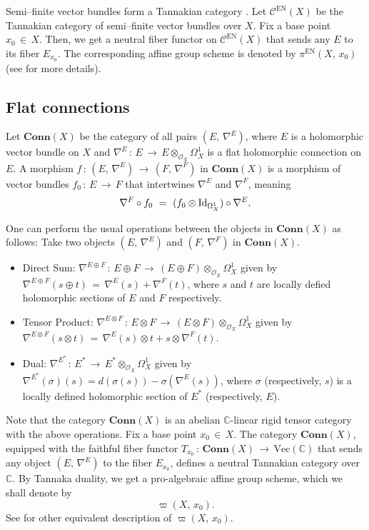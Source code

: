 \documentclass[12pt]{amsart}
\theoremstyle{definition}
\numberwithin{equation}{section}
\newcommand{\C}{\mathbb{C}}
\begin{document}
Semi--finite vector bundles form a Tannakian category \cite[Proposition 2.14]{Ot}.
Let $\mathcal{C}^{\mathrm{EN}}(X)$ be the Tannakian category of semi--finite vector
bundles over $X$. Fix a base point $x_0 \,\in \,X$. Then, we get a neutral fiber functor on
$\mathcal{C}^{\mathrm{EN}}(X)$ that sends any $E$ to its
fiber $E_{x_0}$. The corresponding affine group scheme is denoted by $\pi^{\mathrm{EN}}(X,\,x_0)$ 
(see \cite{Ot} for more details).

\subsection{Flat connections}

Let $\mathbf{Conn}(X)$ be the category of all pairs $(E,\,\nabla^E)$, where $E$ is a 
holomorphic vector bundle on $X$ and $\nabla^E\,:\, E \,\longrightarrow
\, E \otimes_{\mathcal{O}_X} \Omega_X^1$ is a flat holomorphic connection on $E$.
A morphism $f\,:\, (E,\, \nabla^E) \,\longrightarrow\, (F,\, \nabla^F)$ in $\mathbf{Conn}(X)$
is a morphism of vector bundles $f_0\, :\, E\, \longrightarrow\, F$ that intertwines $\nabla^E$ 
and $\nabla^F$, meaning
$$
\nabla^F\circ f_0 \ =\ (f_0\otimes {\rm Id}_{\Omega_X^1})\circ\nabla^E.
$$

One can perform the usual operations between the objects in $\mathbf{Conn}(X)$ as follows:
Take two objects $(E,\,\nabla^E)$ and $(F, \,\nabla^F)$ in $\mathbf{Conn}(X)$.
\begin{itemize}
\item Direct Sum: $\nabla^{E\oplus F}\,:\, E\oplus F\,\longrightarrow \,(E \oplus F)\otimes_{\mathcal{O}_X} 
\Omega_X^1$ given by $\nabla^{E\oplus F}(s\oplus t)\,=\, \nabla^E(s) + \nabla^F(t)$, where 
$s$ and $t$ are locally defied holomorphic sections of $E$ and $F$ respectively.

\item Tensor Product: $\nabla^{E\otimes F}\,:\, E\otimes F\, \longrightarrow\, (E \otimes F)
\otimes_{\mathcal{O}_X} \Omega_X^1$ given by $\nabla^{E\otimes F}(s\otimes t)\,=\,
\nabla^E(s)\otimes t + s\otimes \nabla^F(t)$.

\item Dual: $\nabla^{E^*}\,:\, E^* \,\longrightarrow\, E^* \otimes_{\mathcal{O}_X} \Omega_X^1$ given by
$\nabla^{E^*}(\sigma)(s) = d(\sigma(s)) - \sigma(\nabla^E(s))$, where $\sigma$ (respectively, $s$) is a locally
defined holomorphic section of $E^*$ (respectively, $E$).
\end{itemize} 

Note that the category $\mathbf{Conn}(X)$ is an abelian $\C$-linear rigid tensor category with the
above operations. Fix a base point $x_0 \,\in\, X$. The category $\mathbf{Conn}(X)$, equipped with the
faithful fiber functor $T_{x_0} \,:\, \mathbf{Conn}(X) \,\longrightarrow\, \mathrm{Vec}(\C)$
that sends any object $(E,\, \nabla^E)$ to the fiber $E_{x_0}$, defines a neutral Tannakian category
over $\C$. By Tannaka duality, we get a pro-algebraic affine group scheme, which we shall denote
by
\begin{equation}\label{vp}
\varpi(X,\, x_0).
\end{equation}
See \cite{Si} for other equivalent description of $\varpi(X,\, x_0)$.
\end{document}
